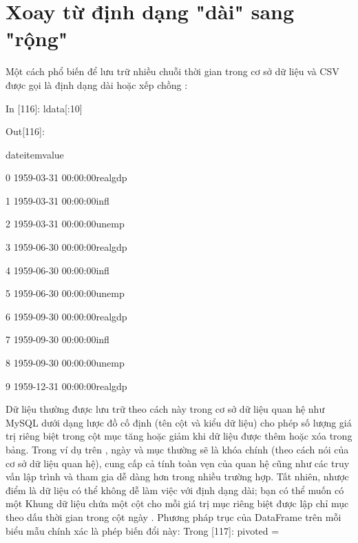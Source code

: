 \section{Xoay từ định dạng "dài" sang "rộng"}
\par\quad\textup Một cách phổ biến để lưu trữ nhiều chuỗi thời gian trong cơ sở dữ liệu và CSV được gọi là định dạng dài hoặc xếp chồng :

\par\quad\textup In [116]: ldata[:10]
\par\quad\textup Out[116]:
\par\quad\textup\quad\quad\quad\quad\quad\quad\quad  date\quad\quad item\quad\quad value
\par\quad\textup 0 1959-03-31 00:00:00\quad realgdp
\par\quad\textup 1 1959-03-31 00:00:00\quad\quad infl\quad{}
\par\quad\textup 2 1959-03-31 00:00:00\quad unemp\quad\xspace\xspace 5.800
\par\quad\textup 3 1959-06-30 00:00:00\quad realgdp 
\par\quad\textup 4 1959-06-30 00:00:00\quad\quad infl\quad{}
\par\quad\textup 5 1959-06-30 00:00:00\quad unemp\quad{}
\par\quad\textup 6 1959-09-30 00:00:00\quad realgdp
\par\quad\textup 7 1959-09-30 00:00:00\quad\quad infl\quad{}
\par\quad\textup 8 1959-09-30 00:00:00\quad unemp\quad\xspace\xspace 5.300
\par\quad\textup 9 1959-12-31 00:00:00\quad realgdp
\par\quad\textup Dữ liệu thường được lưu trữ theo cách này trong cơ sở dữ liệu quan hệ như MySQL dưới dạng lược đồ cố định (tên cột và kiểu dữ liệu) cho phép số lượng giá trị riêng biệt trong cột mục tăng hoặc
giảm khi dữ liệu được thêm hoặc xóa trong bảng. Trong ví dụ trên , ngày và mục thường sẽ là khóa chính (theo cách nói của cơ sở dữ liệu quan hệ), cung cấp cả tính toàn vẹn của quan hệ cũng như các truy vấn lập trình và tham gia dễ dàng hơn trong nhiều trường hợp. Tất nhiên, nhược điểm là dữ
liệu có thể không dễ làm việc với định dạng dài; bạn có thể muốn có một Khung dữ liệu chứa một cột cho mỗi giá trị mục riêng biệt được lập chỉ mục theo dấu thời gian trong cột ngày . Phương pháp trục của DataFrame trên mỗi biểu mẫu chính xác là phép biến đổi này: Trong [117]: pivoted =
